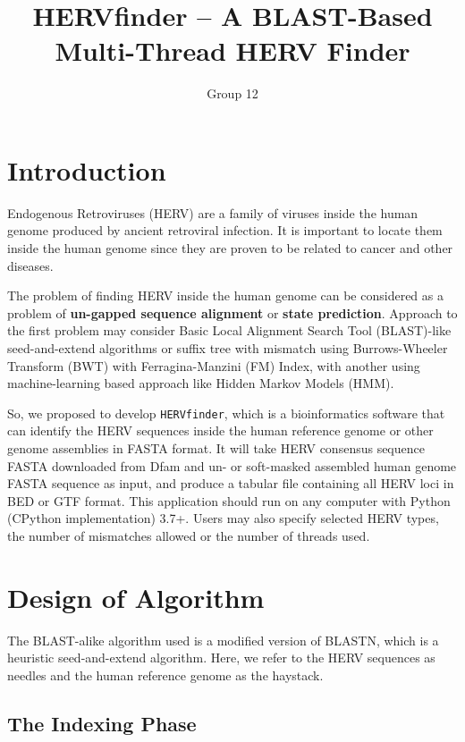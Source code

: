 \documentclass[9pt,final,journal,twocolumn,a4paper]{IEEEtran}
\title{HERVfinder -- A BLAST-Based Multi-Thread HERV Finder}
\author{Group 12}
\begin{document}
\sloppy{}\flushbottom\maketitle\tableofcontents
\section{Introduction}

 Endogenous Retroviruses (HERV) are a family of viruses inside the human genome produced by ancient retroviral infection. It is important to locate them inside the human genome since they are proven to be related to cancer and other diseases.

The problem of finding HERV inside the human genome can be considered as a problem of \textbf{un-gapped sequence alignment} or \textbf{state prediction}. Approach to the first problem may consider Basic Local Alignment Search Tool (BLAST)-like seed-and-extend algorithms or suffix tree with mismatch using Burrows-Wheeler Transform (BWT) with Ferragina-Manzini (FM) Index, with another using machine-learning based approach like Hidden Markov Models (HMM).

So, we proposed to develop \verb|HERVfinder|, which is a bioinformatics software that can identify the HERV sequences inside the human reference genome or other genome assemblies in FASTA format. It will take HERV consensus sequence FASTA downloaded from Dfam and un- or soft-masked assembled human genome FASTA sequence as input, and produce a tabular file containing all HERV loci in BED or GTF format. This application should run on any computer with Python (CPython implementation) 3.7+. Users may also specify selected HERV types, the number of mismatches allowed or the number of threads used.


\section{Design of Algorithm}

The BLAST-alike algorithm used is a modified version of BLASTN, which is a heuristic seed-and-extend algorithm. Here, we refer to the HERV sequences as needles and the human reference genome as the haystack.

\subsection{The \textbf{Indexing} Phase}
\end{document}
